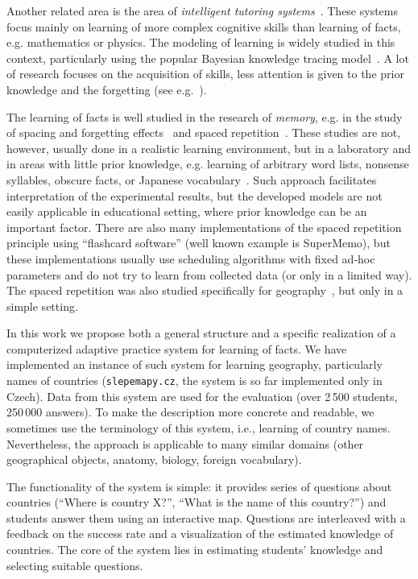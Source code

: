 \documentclass{edm_template}
\begin{document}
Another related area is the area of \emph{intelligent tutoring
systems}~\cite{vanlehn2006behavior}. These systems focus mainly on learning of
more complex cognitive skills than learning of facts, e.g. mathematics or
physics. The modeling of learning is widely studied in this context, particularly
using the popular Bayesian knowledge tracing model~\cite{corbett1994knowledge}.
A lot of research focuses on the acquisition of skills, less attention is given to
the prior knowledge and the forgetting (see e.g.~\cite{pardos2010modeling,qiu2011does}).

The learning of facts is well studied in the research of \emph{memory}, e.g. in the
study of spacing and forgetting effects~\cite{pavlik2005practice} and spaced
repetition~\cite{karpicke2007repeated}. These studies are not, however, usually
done in a realistic learning environment, but in a laboratory
and in areas with little prior knowledge, e.g. learning of arbitrary word
lists, nonsense syllables, obscure facts, or Japanese
vocabulary~\cite{delaney2010spacing,pavlik2005practice}. Such approach
facilitates interpretation of the experimental results, but the developed
models are not easily applicable in educational setting, where prior knowledge
can be an important factor. There are also many implementations of the spaced
repetition principle using ``flashcard software'' (well known example is
SuperMemo), but these implementations usually use scheduling algorithms with
fixed ad-hoc parameters and do not try to learn from collected data (or only
in a limited way). The spaced repetition was also studied specifically for
geography~\cite{zirkle2010effects}, but only in a simple setting.

In this work we propose both a general structure and a specific realization of
a computerized adaptive practice system for learning of facts. We have implemented
an instance of such system for learning geography, particularly names of
countries (\texttt{slepemapy.cz}, the system is so far implemented only in
Czech). Data from this system are used for the evaluation (over 2\,500
students, 250\,000 answers). To make the description more concrete and
readable, we sometimes use the terminology of this system, i.e., learning of
country names. Nevertheless, the approach is applicable to many similar domains
(other geographical objects, anatomy, biology, foreign vocabulary).

The functionality of the system is simple: it provides series of questions
about countries (``Where is country X?'', ``What is the name of this
country?'') and students answer them using an interactive map. Questions are
interleaved with a feedback on the success rate and a visualization of the
estimated knowledge of countries. The core of the system lies in estimating
students' knowledge and selecting suitable questions.
\end{document}
